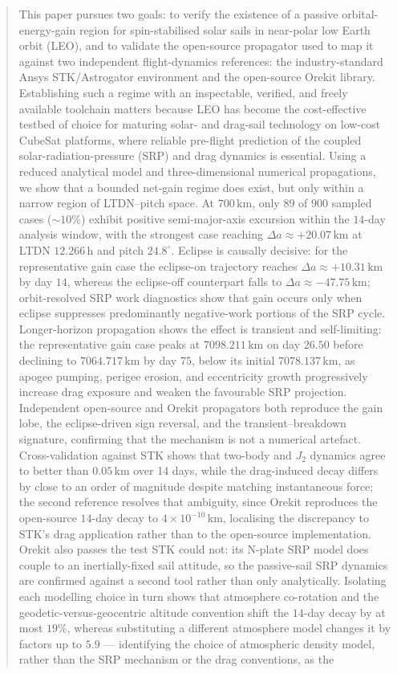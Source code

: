 \documentclass[a4paper,fleqn]{cas-dc}
\begin{document}
\begin{abstract}
This paper pursues two goals: to verify the existence of a passive orbital-energy-gain region for spin-stabilised solar sails in near-polar low Earth orbit (LEO), and to validate the open-source propagator used to map it against two independent flight-dynamics references: the industry-standard Ansys STK/Astrogator environment and the open-source Orekit library. Establishing such a regime with an inspectable, verified, and freely available toolchain matters because LEO has become the cost-effective testbed of choice for maturing solar- and drag-sail technology on low-cost CubeSat platforms, where reliable pre-flight prediction of the coupled solar-radiation-pressure (SRP) and drag dynamics is essential. Using a reduced analytical model and three-dimensional numerical propagations, we show that a bounded net-gain regime does exist, but only within a narrow region of LTDN--pitch space. At \(700\,\mathrm{km}\), only \(89\) of \(900\) sampled cases (\(\sim 10\%\)) exhibit positive semi-major-axis excursion within the \(14\)-day analysis window, with the strongest case reaching \(\Delta a \approx +20.07\,\mathrm{km}\) at LTDN \(12.266\,\mathrm{h}\) and pitch \(24.8^\circ\). Eclipse is causally decisive: for the representative gain case the eclipse-on trajectory reaches \(\Delta a \approx +10.31\,\mathrm{km}\) by day \(14\), whereas the eclipse-off counterpart falls to \(\Delta a \approx -47.75\,\mathrm{km}\); orbit-resolved SRP work diagnostics show that gain occurs only when eclipse suppresses predominantly negative-work portions of the SRP cycle. Longer-horizon propagation shows the effect is transient and self-limiting: the representative gain case peaks at \(7098.211\,\mathrm{km}\) on day \(26.50\) before declining to \(7064.717\,\mathrm{km}\) by day \(75\), below its initial \(7078.137\,\mathrm{km}\), as apogee pumping, perigee erosion, and eccentricity growth progressively increase drag exposure and weaken the favourable SRP projection. Independent open-source and Orekit propagators both reproduce the gain lobe, the eclipse-driven sign reversal, and the transient--breakdown signature, confirming that the mechanism is not a numerical artefact. Cross-validation against STK shows that two-body and \(J_2\) dynamics agree to better than \(0.05\,\mathrm{km}\) over 14 days, while the drag-induced decay differs by close to an order of magnitude despite matching instantaneous force; the second reference resolves that ambiguity, since Orekit reproduces the open-source \(14\)-day decay to \(4\times10^{-10}\,\mathrm{km}\), localising the discrepancy to STK's drag application rather than to the open-source implementation. Orekit also passes the test STK could not: its N-plate SRP model does couple to an inertially-fixed sail attitude, so the passive-sail SRP dynamics are confirmed against a second tool rather than only analytically. Isolating each modelling choice in turn shows that atmosphere co-rotation and the geodetic-versus-geocentric altitude convention shift the \(14\)-day decay by at most \(19\%\), whereas substituting a different atmosphere model changes it by factors up to \(5.9\) --- identifying the choice of atmospheric density model, rather than the SRP mechanism or the drag conventions, as the 
\end{abstract}
\end{document}
